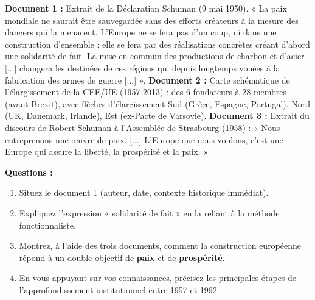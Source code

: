 \documentclass[11pt]{article}
\begin{document}
\begin{exercice}
\textbf{Document 1 :} Extrait de la Déclaration Schuman (9 mai 1950). « La paix mondiale ne saurait être sauvegardée sans des efforts créateurs à la mesure des dangers qui la menacent. L'Europe ne se fera pas d'un coup, ni dans une construction d'ensemble : elle se fera par des réalisations concrètes créant d'abord une solidarité de fait. La mise en commun des productions de charbon et d'acier [...] changera les destinées de ces régions qui depuis longtemps vouées à la fabrication des armes de guerre [...] ».
\textbf{Document 2 :} Carte schématique de l'élargissement de la CEE/UE (1957-2013) : des 6 fondateurs à 28 membres (avant Brexit), avec flèches d'élargissement Sud (Grèce, Espagne, Portugal), Nord (UK, Danemark, Irlande), Est (ex-Pacte de Varsovie).
\textbf{Document 3 :} Extrait du discours de Robert Schuman à l'Assemblée de Strasbourg (1958) : « Nous entreprenons une œuvre de paix. [...] L'Europe que nous voulons, c'est une Europe qui assure la liberté, la prospérité et la paix. »

\textbf{Questions :}
\begin{enumerate}
    \item Situez le document 1 (auteur, date, contexte historique immédiat).
    \item Expliquez l'expression « solidarité de fait » en la reliant à la méthode fonctionnaliste.
    \item Montrez, à l'aide des trois documents, comment la construction européenne répond à un double objectif de \textbf{paix} et de \textbf{prospérité}.
    \item En vous appuyant sur vos connaissances, précisez les principales étapes de l'approfondissement institutionnel entre 1957 et 1992.
\end{enumerate}
\end{exercice}
\end{document}
